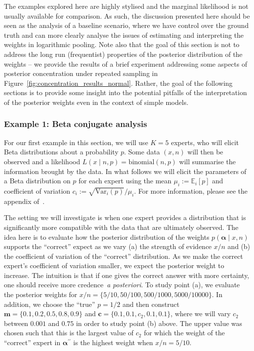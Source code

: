 \documentclass[12pt]{article}
\begin{document}
The examples explored here are highly stylised and the marginal likelihood is not usually available for comparison.
As such, the discussion presented here should be seen as the analysis of a baseline scenario, where we have control over the ground truth and can more clearly analyse the issues of estimating and interpreting the weights in logarithmic pooling.
Note also that the goal of this section is not to address the long run (frequentist) properties of the posterior distribution of the weights -- we provide the results of a brief experiment addressing some aspects of posterior concentration under repeated sampling in Figure~\ref{fig:concentration_results_normal}.
Rather, the goal of the following sections is to provide some insight into the potential pitfalls of the interpretation of the posterior weights even in the context of simple models.

\subsubsection{Example 1: Beta conjugate analysis}
\label{sec:learning_rate_beta}

For our first example in this section, we will use $K = 5$ experts, who will elicit Beta distributions about a probability $p$.
Some data $(x, n)$ will then be observed and a likelihood $L(x \mid n, p) = \text{binomial}(n, p)$ will summarise the information brought by the data.
In what follows we will elicit the parameters of a Beta distribution on $p$ for each expert using the mean $\mu_i :=  \mathbb{E}_i[p]$ and coefficient of variation $c_i := \sqrt{\text{Var}_i(p)}/ \mu_i$.
For more information, please see the appendix of~\textcite{Coelho2015}.

The
setting we will investigate is when one expert provides a distribution that is significantly more compatible with the data that are ultimately observed.
The idea here is to evaluate how the posterior distribution of the weights $p(\boldsymbol\alpha \mid x, n)$ supports the ``correct'' expect as we vary (a) the strength of evidence $x/n$ and (b) the coefficient of variation of the ``correct'' distribution.
As we make the correct expert's coefficient of variation smaller, we expect the posterior weight to increase.
The intuition is that if one gives the correct answer with more certainty, one should receive more credence~\textit{a posteriori}.
To study point (a), we evaluate the posterior weights for $x/n = \{5/10, 50/100, 500/1000, 5000/10000 \}$.
In addition, we choose the ``true'' $p = 1/2$ and then construct $\boldsymbol{m} = \{0.1, 0.2, 0.5, 0.8, 0.9\}$ and $\boldsymbol c = \{0.1, 0.1, c_2, 0.1, 0.1 \}$, where we will vary $c_2$ between $0.001$ and $0.75$ in order to study point (b) above.
The upper value was chosen such that this is the largest value of $c_2$ for which the weight of the ``correct'' expert in $\boldsymbol\alpha^{\prime\prime}$ is the highest weight when $x/n=5/10$.
\end{document}
